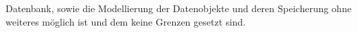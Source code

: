     Datenbank, sowie die Modellierung der Datenobjekte und deren Speicherung ohne weiteres möglich ist und dem keine Grenzen gesetzt sind.  
